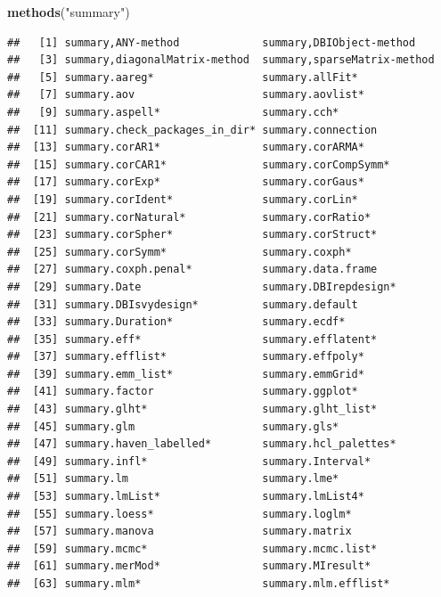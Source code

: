 \documentclass[
]{book}
\newenvironment{Shaded}{\begin{snugshade}}{\end{snugshade}}
\newcommand{\KeywordTok}[1]{\textcolor[rgb]{0.13,0.29,0.53}{\textbf{#1}}}
\newcommand{\NormalTok}[1]{#1}
\newcommand{\StringTok}[1]{\textcolor[rgb]{0.31,0.60,0.02}{#1}}
\begin{document}
\begin{Shaded}
\begin{Highlighting}[]
\KeywordTok{methods}\NormalTok{(}\StringTok{"summary"}\NormalTok{)}
\end{Highlighting}
\end{Shaded}

\begin{verbatim}
##   [1] summary,ANY-method             summary,DBIObject-method      
##   [3] summary,diagonalMatrix-method  summary,sparseMatrix-method   
##   [5] summary.aareg*                 summary.allFit*               
##   [7] summary.aov                    summary.aovlist*              
##   [9] summary.aspell*                summary.cch*                  
##  [11] summary.check_packages_in_dir* summary.connection            
##  [13] summary.corAR1*                summary.corARMA*              
##  [15] summary.corCAR1*               summary.corCompSymm*          
##  [17] summary.corExp*                summary.corGaus*              
##  [19] summary.corIdent*              summary.corLin*               
##  [21] summary.corNatural*            summary.corRatio*             
##  [23] summary.corSpher*              summary.corStruct*            
##  [25] summary.corSymm*               summary.coxph*                
##  [27] summary.coxph.penal*           summary.data.frame            
##  [29] summary.Date                   summary.DBIrepdesign*         
##  [31] summary.DBIsvydesign*          summary.default               
##  [33] summary.Duration*              summary.ecdf*                 
##  [35] summary.eff*                   summary.efflatent*            
##  [37] summary.efflist*               summary.effpoly*              
##  [39] summary.emm_list*              summary.emmGrid*              
##  [41] summary.factor                 summary.ggplot*               
##  [43] summary.glht*                  summary.glht_list*            
##  [45] summary.glm                    summary.gls*                  
##  [47] summary.haven_labelled*        summary.hcl_palettes*         
##  [49] summary.infl*                  summary.Interval*             
##  [51] summary.lm                     summary.lme*                  
##  [53] summary.lmList*                summary.lmList4*              
##  [55] summary.loess*                 summary.loglm*                
##  [57] summary.manova                 summary.matrix                
##  [59] summary.mcmc*                  summary.mcmc.list*            
##  [61] summary.merMod*                summary.MIresult*             
##  [63] summary.mlm*                   summary.mlm.efflist*          

\end{verbatim}
\end{document}

